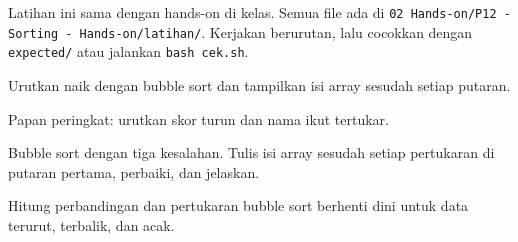 \documentclass[a4paper]{article}
\begin{document}
Latihan ini sama dengan hands-on di kelas. Semua file ada di \texttt{02 Hands-on/P12 - Sorting - Hands-on/latihan/}. Kerjakan berurutan, lalu cocokkan dengan \texttt{expected/} atau jalankan \texttt{bash cek.sh}.
\par\vspace{4pt}\par\vspace{6pt}
Urutkan naik dengan bubble sort dan tampilkan isi array sesudah setiap putaran.

Papan peringkat: urutkan skor turun dan nama ikut tertukar.

Bubble sort dengan tiga kesalahan. Tulis isi array sesudah setiap pertukaran di putaran pertama, perbaiki, dan jelaskan.

Hitung perbandingan dan pertukaran bubble sort berhenti dini untuk data terurut, terbalik, dan acak.
\end{document}

